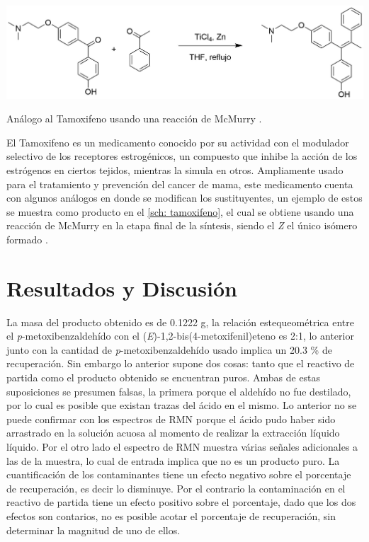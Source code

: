 \documentclass[fleqn,11pt]{SelfArx}
\begin{document}
\begin{scheme}[h]
	\centering
	\includegraphics[width=0.9\linewidth]{structures/Tamoxifeno.png}
	\caption{An\'alogo al Tamoxifeno usando una reacci\'on de McMurry \cite{Zheng2007}.}
	\label{sch: tamoxifeno}
\end{scheme}
El Tamoxifeno es un medicamento conocido por su actividad con el modulador selectivo de los receptores estrog\'enicos, un compuesto que inhibe la acci\'on de los estr\'ogenos en ciertos tejidos, mientras la simula en otros. Ampliamente usado para el tratamiento y prevenci\'on del cancer de mama, este medicamento cuenta con algunos an\'alogos en donde se modifican los sustituyentes, un ejemplo de estos se muestra como producto en el \autoref{sch: tamoxifeno}, el cual se obtiene usando una reacci\'on de McMurry en la etapa final de la s\'intesis, siendo el \textit{Z} el \'unico is\'omero formado \cite{Zheng2007}.

\section{Resultados y Discusi\'on}
La masa del producto obtenido es de 0.1222 g, la relaci\'on estequeom\'etrica entre el \textit{p}-metoxibenzaldeh\'ido con el (\textit{E})-1,2-bis(4-metoxifenil)eteno es 2:1, lo anterior junto con la cantidad de \textit{p}-metoxibenzaldeh\'ido usado implica un 20.3 \% de recuperaci\'on. Sin embargo lo anterior supone dos cosas: tanto que el reactivo de partida como el producto obtenido se encuentran puros. Ambas de estas suposiciones se presumen falsas, la primera porque el aldeh\'ido no fue destilado, por lo cual es posible que existan trazas del \'acido en el mismo. Lo anterior no se puede confirmar con los espectros de RMN porque el \'acido pudo haber sido arrastrado en la soluci\'on acuosa al momento de realizar la extracci\'on l\'iquido l\'iquido. Por el otro lado el espectro de RMN muestra v\'arias señales adicionales a las de la muestra, lo cual de entrada implica que no es un producto puro. La cuantificaci\'on de los contaminantes tiene un efecto negativo sobre el porcentaje de recuperaci\'on, es decir lo disminuye. Por el contrario la contaminaci\'on en el reactivo de partida tiene un efecto positivo sobre el porcentaje, dado que los dos efectos son contarios, no es posible acotar el porcentaje de recuperaci\'on, sin determinar la magnitud de uno de ellos.
\end{document}
